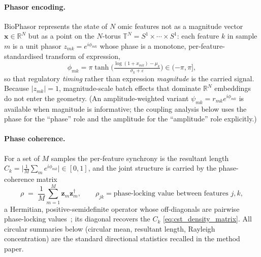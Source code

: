 \documentclass[preprint,12pt,amsmath,amssymb,superscriptaddress,floatfix]{revtex4-2}
\newcommand{\reals}{\mathbb{R}}
\newcommand{\torus}{\mathbb{T}}
\begin{document}
\paragraph{Phasor encoding.}
BioPhasor represents the state of $N$ omic features not as a magnitude vector
$\boldsymbol{x}\in\reals^N$ but as a point on the $N$-torus
$\torus^N=S^1\times\cdots\times S^1$: each feature $k$ in sample $m$ is a unit
phasor $z_{mk}=e^{i\phi_{mk}}$ whose phase is a monotone, per-feature-standardised
transform of expression,
\begin{equation}
  \phi_{mk} = \pi\tanh\!\Big(\tfrac{\log(1+x_{mk})-\mu_k}{\sigma_k+\varepsilon}\Big)
  \in(-\pi,\pi],
  \label{def:encoding}
\end{equation}
so that regulatory \emph{timing} rather than expression \emph{magnitude} is the
carried signal. Because $|z_{mk}|=1$, magnitude-scale batch effects that dominate
$\reals^N$ embeddings do not enter the geometry. (An amplitude-weighted variant
$\psi_{mk}=r_{mk}e^{i\phi_{mk}}$ is available when magnitude is informative; the
coupling analysis below uses the phase for the ``phase'' role and the amplitude
for the ``amplitude'' role explicitly.)

\paragraph{Phase coherence.}
For a set of $M$ samples the per-feature synchrony is the resultant length
$C_k=\big|\tfrac1M\sum_m e^{i\phi_{mk}}\big|\in[0,1]$, and the joint structure is
carried by the phase-coherence matrix
\begin{equation}
  \rho \;=\; \frac1M\sum_{m=1}^{M}\boldsymbol z_m\boldsymbol z_m^{\dagger},
  \qquad \rho_{jk}=\text{phase-locking value between features }j,k,
  \label{eq:cst_density_matrix}
\end{equation}
a Hermitian, positive-semidefinite operator whose off-diagonals are pairwise
phase-locking values~\cite{scherer2022}; its diagonal recovers the $C_k$
\eqref{eq:cst_density_matrix}. All circular summaries below (circular mean,
resultant length, Rayleigh concentration) are the standard directional
statistics recalled in the method paper.
\end{document}
